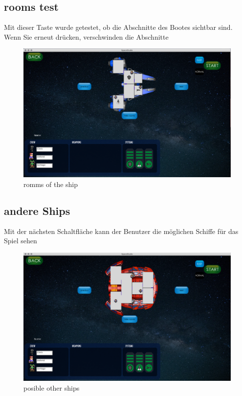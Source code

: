 \documentclass[12pt]{article}
\begin{document}
\subsection{rooms test}

Mit dieser Taste wurde getestet, ob die Abschnitte des Bootes sichtbar sind. Wenn Sie erneut drücken, verschwinden die Abschnitte\\
\begin{figure}
\centering
\includegraphics[scale=0.3]{TestProtocolBilder/shipRooms.png}
\caption{romms of the ship}
\end{figure}

\newpage
\subsection{andere Ships}
Mit der nächsten Schaltfläche kann der Benutzer die möglichen Schiffe für das Spiel sehen
\begin{figure}
\centering
\includegraphics[scale=0.3]{TestProtocolBilder/next.png}
\caption{posible other ships}
\end{figure}
\end{document}
